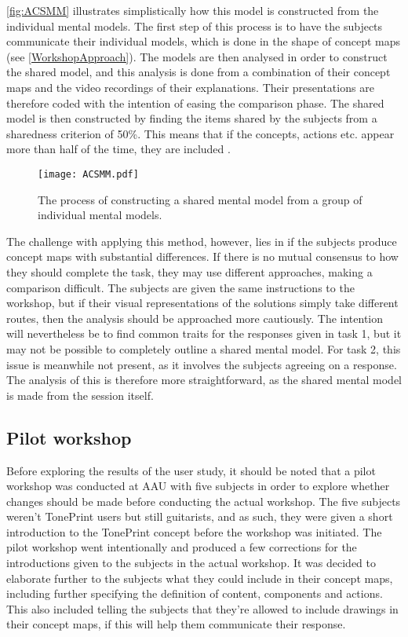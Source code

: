 \autoref{fig:ACSMM} illustrates simplistically how this model is constructed from the individual mental models. The first step of this process is to have the subjects communicate their individual models, which is done in the shape of concept maps (see \autoref{WorkshopApproach}). The models are then analysed in order to construct the shared model, and this analysis is done from a combination of their concept maps and the video recordings of their explanations. Their presentations are therefore coded with the intention of easing the comparison phase. The shared model is then constructed by finding the items shared by the subjects from a sharedness criterion of 50\%. This means that if the concepts, actions etc. appear more than half of the time, they are included \parencite[][128]{WEB:ConceptMapAnalysis}.
%
\begin{figure}[H]
	\centering
	\texttt{[image: ACSMM.pdf]}
	\caption{The process of constructing a shared mental model from a group of individual mental models.}
	\label{fig:ACSMM}
\end{figure}
%
\noindent
The challenge with applying this method, however, lies in if the subjects produce concept maps with substantial differences. If there is no mutual consensus to how they should complete the task, they may use different approaches, making a comparison difficult. The subjects are given the same instructions to the workshop, but if their visual representations of the solutions simply take different routes, then the analysis should be approached more cautiously. The intention will nevertheless be to find common traits for the responses given in task 1, but it may not be possible to completely outline a shared mental model. For task 2, this issue is meanwhile not present, as it involves the subjects agreeing on a response. The analysis of this is therefore more straightforward, as the shared mental model is made from the session itself.

\subsection{Pilot workshop}
\label{PilotTest}
Before exploring the results of the user study, it should be noted that a pilot workshop was conducted at AAU with five subjects in order to explore whether changes should be made before conducting the actual workshop. The five subjects weren't TonePrint users but still guitarists, and as such, they were given a short introduction to the TonePrint concept before the workshop was initiated. The pilot workshop went intentionally and produced a few corrections for the introductions given to the subjects in the actual workshop. It was decided to elaborate further to the subjects what they could include in their concept maps, including further specifying the definition of content, components and actions. This also included telling the subjects that they're allowed to include drawings in their concept maps, if this will help them communicate their response.

